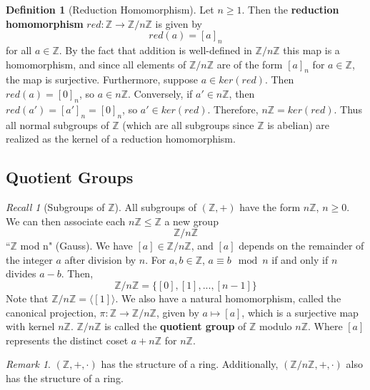 \documentclass[12pt]{article}
\theoremstyle{definition}
\newtheorem{defn}[thm]{Definition}
\theoremstyle{remark}
\newtheorem{rmk}[thm]{Remark}
\newtheorem*{rec}{Recall}
\numberwithin{equation}{section}
\newcommand\Z{\mathbb Z}    %
\newcommand\B[1]{\textbf{ #1}}
\begin{document}
\vspace{15pt}

\begin{defn}[Reduction Homomorphism]
        Let $n \geq 1$. Then the \B{reduction homomorphism} $red:\Z\rightarrow \Z/n\Z$ is given by \begin{equation}
                red(a) = [a]_n
        \end{equation}
        for all $a \in \Z$. By the fact that addition is well-defined in $\Z/n\Z$ this map is a homomorphism, and since all elements of $\Z/n\Z$ are of the form $[a]_n$ for $a \in \Z$, the map is surjective. Furthermore, suppose $a \in ker(red)$. Then $red(a) = [0]_n$, so $a \in n\Z$. Conversely, if $a' \in n\Z$, then $red(a') = [a']_n = [0]_n$, so $a' \in ker(red)$. Therefore, $n\Z = ker(red)$. Thus all normal subgroups of $\Z$ (which are all subgroups since $\Z$ is abelian) are realized as the kernel of a reduction homomorphism.
\end{defn}


\clearpage


\subsection{Quotient Groups}


\begin{rec}[Subgroups of $\Z$]
        All subgroups of $(\Z,+)$ have the form $n\Z$, $n\geq 0$. We can then associate each $n\Z\leq \Z$ a new group \begin{equation}
                \Z/n\Z
        \end{equation}
        ``$\Z$ mod n" (Gauss). We have $[a] \in \Z/n\Z$, and $[a]$ depends on the remainder of the integer $a$ after division by $n$. For $a,b \in \Z$, $a \equiv b \mod n$ if and only if $n$ divides $a-b$. Then, \begin{equation}
                \Z/n\Z = \{[0],[1],...,[n-1]\}
        \end{equation}
        Note that $\Z/n\Z = \langle [1] \rangle$. We also have a natural homomorphism, called the canonical projection, $\pi:\Z \rightarrow \Z/n\Z$, given by $a\mapsto [a]$, which is a surjective map with kernel $n\Z$. $\Z/n\Z$ is called the \B{quotient group} of $\Z$ modulo $n\Z$. Where $[a]$ represents the distinct coset $a + n\Z$ for $n\Z$.
\end{rec}

\vspace{15pt}

\begin{rmk}
        $(\Z,+,\cdot)$ has the structure of a ring. Additionally, $(\Z/n\Z, +, \cdot)$ also has the structure of a ring.
\end{rmk}
\end{document}
